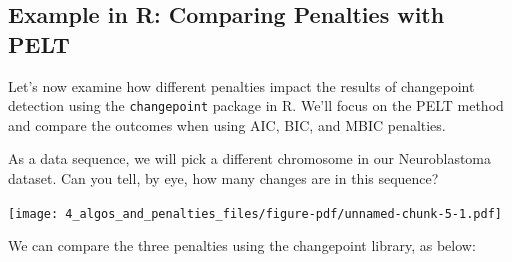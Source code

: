 \documentclass[
  letterpaper,
  DIV=11,
  numbers=noendperiod]{scrreprt}
\begin{document}
\subsection{Example in R: Comparing Penalties with
PELT}\label{example-in-r-comparing-penalties-with-pelt}

Let's now examine how different penalties impact the results of
changepoint detection using the \texttt{changepoint} package in R. We'll
focus on the PELT method and compare the outcomes when using AIC, BIC,
and MBIC penalties.

As a data sequence, we will pick a different chromosome in our
Neuroblastoma dataset. Can you tell, by eye, how many changes are in
this sequence?

\texttt{[image: 4\_algos\_and\_penalties\_files/figure-pdf/unnamed-chunk-5-1.pdf]}

We can compare the three penalties using the changepoint library, as
below:
\end{document}
